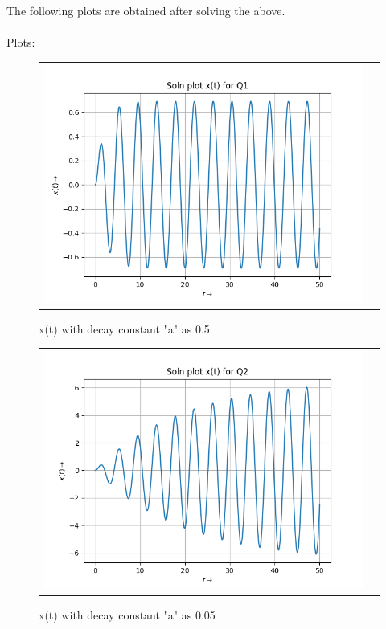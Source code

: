 \documentclass[11pt, a4paper]{article}
\begin{document}
    	\pagebreak
	The following plots are obtained after solving the above.\\
	\\Plots:
	       \begin{figure}[H]
                    \centering
                    \setlength\tabcolsep{2pt}
                    \begin{tabular}{cc}
                       \includegraphics[scale=0.9]{Figure 1.png}
                    \end{tabular}
                    \caption{x(t) with decay constant "a" as 0.5} 
                \end{figure}
                \begin{figure}[H]
                    \centering
                    \setlength\tabcolsep{2pt}
                    \begin{tabular}{cc}
                       \includegraphics[scale=0.9]{Figure 2.png}
                    \end{tabular}
                    \caption{x(t) with decay constant "a" as 0.05} 
                \end{figure}
	 \pagebreak
	 
\end{document}
